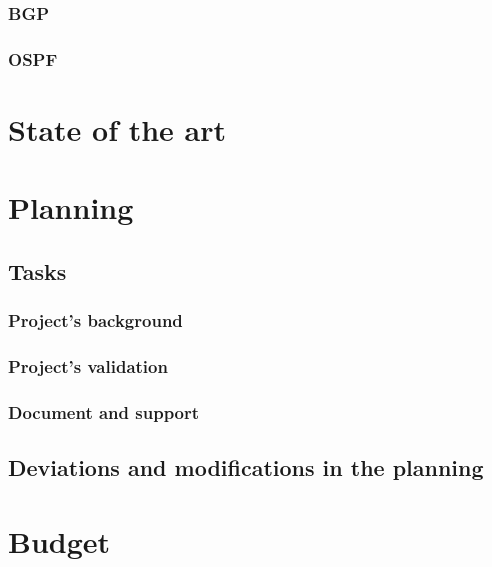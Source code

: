 \subsubsection{BGP}
\label{subsubsec:BADV}


\subsubsection{OSPF}


\section{State of the art}
\label{sec:soa}


\section{Planning}
\label{sec:tp}


\subsection{Tasks}


\subsubsection{Project's background}


\subsubsection{Project's validation}


\subsubsection{Document and support}



\subsection{Deviations and modifications in the planning}


\section{Budget} 

